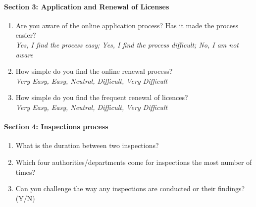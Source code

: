 \documentclass[a4paper, 12pt]{article}
\begin{document}
	\paragraph {Section 3: Application and Renewal of Licenses}
		\begin {enumerate}[topsep=0pt, nosep]
		\item Are you aware of the online application process? Has it made the process easier?\\
		\textit{Yes, I find the process easy; Yes, I find the process difficult; No, I am not aware}
		\item How simple do you find the online renewal process?\\
		\textit{Very Easy, Easy, Neutral, Difficult, Very Difficult}
		\item How simple do you find the frequent renewal of licences?\\
		\textit{Very Easy, Easy, Neutral, Difficult, Very Difficult}
		\end {enumerate}

	\paragraph {Section 4: Inspections process}
		\begin {enumerate} [topsep=0pt, nosep]
		\item What is the duration between two inspections?
		\item Which four authorities/departments come for inspections the most number of times?
		\item Can you challenge the way any inspections are conducted or their findings? (Y/N)
		\end {enumerate} 
\end{document}
